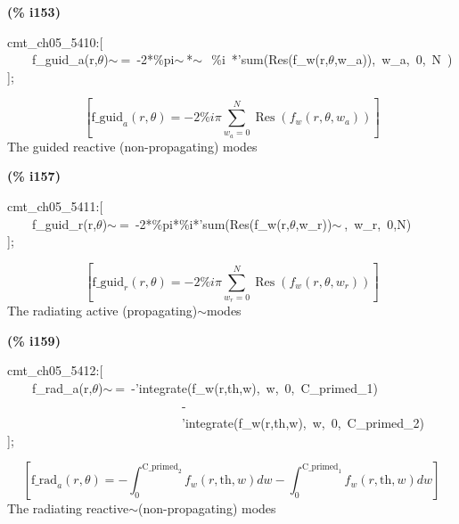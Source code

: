 \documentclass[fleqn]{article}
\begin{document}
\noindent
\begin{minipage}[t]{4.000000em}\color{red}\bfseries
(\% i153)	
\end{minipage}
\begin{minipage}[t]{\textwidth}\color{blue}
cmt\_ch05\_5410:[\\
\ \ \ \ f\_guid\_a(r,\ensuremath{\theta})\ensuremath{\sim\ }=\ -2*\%pi\ensuremath{\sim\ }*\ensuremath{\sim\ }\ \%i\ *'sum(Res(f\_w(r,\ensuremath{\theta},w\_a)),\ w\_a,\ 0,\ N\ )\\
];
\end{minipage}
\[\displaystyle \tag{\% o153} 
\left[ {{\ensuremath{\mathrm{f\_ guid}}}_a}\left( r\operatorname{,}\theta \right) =-2 \% i \ensuremath{\pi}  \sum_{{w_a}=0}^{N}{\left. \operatorname{Res}\left( {f_w}\left( r\operatorname{,}\theta \operatorname{,}{w_a}\right) \right) \right.}\right] \mbox{}
\]
The guided reactive (non-propagating) modes


\noindent
\begin{minipage}[t]{4.000000em}\color{red}\bfseries
(\% i157)	
\end{minipage}
\begin{minipage}[t]{\textwidth}\color{blue}
cmt\_ch05\_5411:[\\
\ \ \ \ f\_guid\_r(r,\ensuremath{\theta})\ensuremath{\sim\ }=\ -2*\%pi*\%i*'sum(Res(f\_w(r,\ensuremath{\theta},w\_r))\ensuremath{\sim\ },\ w\_r,\ 0,N)\\
];
\end{minipage}
\[\displaystyle \tag{\% o157} 
\left[ {{\ensuremath{\mathrm{f\_ guid}}}_r}\left( r\operatorname{,}\theta \right) =-2 \% i \ensuremath{\pi}  \sum_{{w_r}=0}^{N}{\left. \operatorname{Res}\left( {f_w}\left( r\operatorname{,}\theta \operatorname{,}{w_r}\right) \right) \right.}\right] \mbox{}
\]
The radiating active (propagating)\ensuremath{\sim }modes


\noindent
\begin{minipage}[t]{4.000000em}\color{red}\bfseries
(\% i159)	
\end{minipage}
\begin{minipage}[t]{\textwidth}\color{blue}
cmt\_ch05\_5412:[\\
\ \ \ \ f\_rad\_a(r,\ensuremath{\theta})\ensuremath{\sim\ }=\ -'integrate(f\_w(r,th,w),\ w,\ 0,\ C\_primed\_1)\\
\ \ \ \ \ \ \ \ \ \ \ \ \ \ \ \ \ \ \ \ \ \ \ \ \ \ \ \ -\\
\ \ \ \ \ \ \ \ \ \ \ \ \ \ \ \ \ \ \ \ \ \ \ \ \ \ \ \ 'integrate(f\_w(r,th,w),\ w,\ 0,\ C\_primed\_2)\\
];
\end{minipage}
\[\displaystyle \tag{\% o159} 
\left[ {{\ensuremath{\mathrm{f\_ rad}}}_a}\left( r\operatorname{,}\theta \right) =-\int_{0}^{{{\ensuremath{\mathrm{C\_ primed}}}_2}}{\left. {f_w}\left( r\operatorname{,}\ensuremath{\mathrm{th}}\operatorname{,}w\right) dw\right.}-\int_{0}^{{{\ensuremath{\mathrm{C\_ primed}}}_1}}{\left. {f_w}\left( r\operatorname{,}\ensuremath{\mathrm{th}}\operatorname{,}w\right) dw\right.}\right] \mbox{}
\]
The radiating reactive\ensuremath{\sim }(non-propagating) modes
\end{document}
